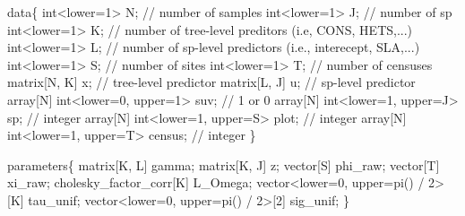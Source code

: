 \documentclass[
  12pt,
  letterpaper,
  DIV=11,
  numbers=noendperiod]{scrartcl}
\newenvironment{Shaded}{\begin{snugshade}}{\end{snugshade}}
\newcommand{\CommentTok}[1]{\textcolor[rgb]{0.37,0.37,0.37}{#1}}
\newcommand{\DataTypeTok}[1]{\textcolor[rgb]{0.68,0.00,0.00}{#1}}
\newcommand{\DecValTok}[1]{\textcolor[rgb]{0.68,0.00,0.00}{#1}}
\newcommand{\KeywordTok}[1]{\textcolor[rgb]{0.00,0.23,0.31}{#1}}
\newcommand{\NormalTok}[1]{\textcolor[rgb]{0.00,0.23,0.31}{#1}}
\begin{document}
\begin{Shaded}
\begin{Highlighting}[]
\KeywordTok{data}\NormalTok{\{}
  \DataTypeTok{int}\NormalTok{\textless{}}\KeywordTok{lower}\NormalTok{=}\DecValTok{1}\NormalTok{\textgreater{} N; }\CommentTok{// number of samples}
  \DataTypeTok{int}\NormalTok{\textless{}}\KeywordTok{lower}\NormalTok{=}\DecValTok{1}\NormalTok{\textgreater{} J; }\CommentTok{// number of sp}
  \DataTypeTok{int}\NormalTok{\textless{}}\KeywordTok{lower}\NormalTok{=}\DecValTok{1}\NormalTok{\textgreater{} K; }\CommentTok{// number of tree{-}level preditors (i.e, CONS, HETS,...)}
  \DataTypeTok{int}\NormalTok{\textless{}}\KeywordTok{lower}\NormalTok{=}\DecValTok{1}\NormalTok{\textgreater{} L; }\CommentTok{// number of sp{-}level predictors (i.e., interecept, SLA,...)}
  \DataTypeTok{int}\NormalTok{\textless{}}\KeywordTok{lower}\NormalTok{=}\DecValTok{1}\NormalTok{\textgreater{} S; }\CommentTok{// number of sites}
  \DataTypeTok{int}\NormalTok{\textless{}}\KeywordTok{lower}\NormalTok{=}\DecValTok{1}\NormalTok{\textgreater{} T; }\CommentTok{// number of censuses}
  \DataTypeTok{matrix}\NormalTok{[N, K] x; }\CommentTok{// tree{-}level predictor}
  \DataTypeTok{matrix}\NormalTok{[L, J] u; }\CommentTok{// sp{-}level predictor}
  \DataTypeTok{array}\NormalTok{[N] }\DataTypeTok{int}\NormalTok{\textless{}}\KeywordTok{lower}\NormalTok{=}\DecValTok{0}\NormalTok{, }\KeywordTok{upper}\NormalTok{=}\DecValTok{1}\NormalTok{\textgreater{} suv; }\CommentTok{// 1 or 0}
  \DataTypeTok{array}\NormalTok{[N] }\DataTypeTok{int}\NormalTok{\textless{}}\KeywordTok{lower}\NormalTok{=}\DecValTok{1}\NormalTok{, }\KeywordTok{upper}\NormalTok{=J\textgreater{} sp; }\CommentTok{// integer}
  \DataTypeTok{array}\NormalTok{[N] }\DataTypeTok{int}\NormalTok{\textless{}}\KeywordTok{lower}\NormalTok{=}\DecValTok{1}\NormalTok{, }\KeywordTok{upper}\NormalTok{=S\textgreater{} plot; }\CommentTok{// integer}
  \DataTypeTok{array}\NormalTok{[N] }\DataTypeTok{int}\NormalTok{\textless{}}\KeywordTok{lower}\NormalTok{=}\DecValTok{1}\NormalTok{, }\KeywordTok{upper}\NormalTok{=T\textgreater{} census; }\CommentTok{// integer}
\NormalTok{\}}

\KeywordTok{parameters}\NormalTok{\{}
  \DataTypeTok{matrix}\NormalTok{[K, L] gamma;}
  \DataTypeTok{matrix}\NormalTok{[K, J] z;}
  \DataTypeTok{vector}\NormalTok{[S] phi\_raw;}
  \DataTypeTok{vector}\NormalTok{[T] xi\_raw;}
  \DataTypeTok{cholesky\_factor\_corr}\NormalTok{[K] L\_Omega;}
  \DataTypeTok{vector}\NormalTok{\textless{}}\KeywordTok{lower}\NormalTok{=}\DecValTok{0}\NormalTok{, }\KeywordTok{upper}\NormalTok{=pi() / }\DecValTok{2}\NormalTok{\textgreater{}[K] tau\_unif;}
  \DataTypeTok{vector}\NormalTok{\textless{}}\KeywordTok{lower}\NormalTok{=}\DecValTok{0}\NormalTok{, }\KeywordTok{upper}\NormalTok{=pi() / }\DecValTok{2}\NormalTok{\textgreater{}[}\DecValTok{2}\NormalTok{] sig\_unif;}
\NormalTok{\}}


\end{Highlighting}
\end{Shaded}
\end{document}
